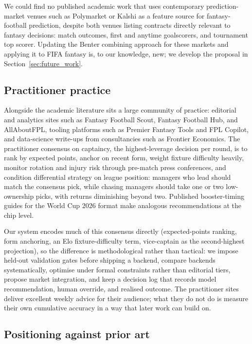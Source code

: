 We could find no published academic work that uses contemporary
prediction-market venues such as Polymarket or Kalshi as a feature
source for fantasy-football prediction, despite both venues listing
contracts directly relevant to fantasy decisions: match outcomes,
first and anytime goalscorers, and tournament top scorer. Updating
the Benter combining approach for these markets and applying it to
FIFA fantasy is, to our knowledge, new; we develop the proposal in
Section~\ref{sec:future_work}.

\subsection{Practitioner practice}
\label{sec:related-practice}

Alongside the academic literature sits a large community of practice:
editorial and analytics sites such as Fantasy Football Scout, Fantasy
Football Hub, and AllAboutFPL, tooling platforms such as Premier
Fantasy Tools and FPL Copilot, and data-science write-ups from
consultancies such as Frontier Economics.
The practitioner consensus on captaincy, the highest-leverage
decision per round, is to rank by expected points, anchor on recent
form, weight fixture difficulty heavily, monitor rotation and injury
risk through pre-match press conferences, and condition differential
strategy on league position: managers who lead should match the
consensus pick, while chasing managers should take one or two
low-ownership picks, with returns diminishing beyond two. Published
booster-timing guides for the World Cup 2026 format make analogous
recommendations at the chip level.

Our system encodes much of this consensus directly (expected-points
ranking, form anchoring, an Elo fixture-difficulty term, vice-captain
as the second-highest projection), so the difference is
methodological rather than tactical: we impose held-out validation
gates before shipping a backend, compare backends systematically,
optimise under formal constraints rather than editorial tiers,
propose market integration, and keep a decision log that records
model recommendation, human override, and realised outcome. The
practitioner sites deliver excellent weekly advice for their
audience; what they do not do is measure their own cumulative
accuracy in a way that later work can build on.

\subsection{Positioning against prior art}
\label{sec:related-positioning}

